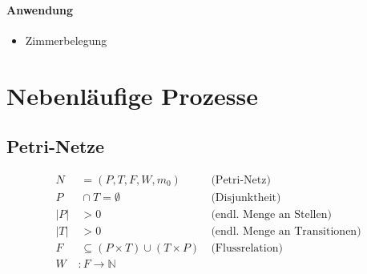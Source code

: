 \documentclass{article}
\begin{document}
\paragraph*{Anwendung}
\begin{itemize}
    \item Zimmerbelegung
\end{itemize}

\section{Nebenläufige Prozesse}
\subsection{Petri-Netze}
\begin{align}
    N &\:= (P, T, F, W, m_0) &\: \text{(Petri-Netz)}\\
    P &\:\cap T = \emptyset &\: \text{(Disjunktheit)}\\
    |P| &\:> 0 &\:\text{(endl. Menge an Stellen)}\\
    |T| &\:> 0 &\:\text{(endl. Menge an Transitionen)}    \\
    F &\:\subseteq (P \times T) \cup (T \times P) &\:\text{(Flussrelation)}\\
    W\:&:F\rightarrow \mathbb{N}
\end{align}
\end{document}
